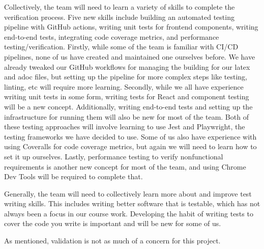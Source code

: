 \documentclass[12pt, titlepage]{article}
\begin{document}
\begin{enumerate}
    Collectively, the team will need to learn a variety of skills to complete
    the verification process. Five new skills include building an automated
    testing pipeline with GitHub actions, writing unit tests for frontend
    components, writing end-to-end tests, integrating code coverage metrics,
    and performance testing/verification. Firstly, while some of the team is
    familiar with CI/CD pipelines, none of us have created and maintained one
    ourselves before. We have already tweaked our GitHub workflows for managing
    the building for our latex and adoc files, but setting up the pipeline for
    more complex steps like testing, linting, etc will require more learning.
    Secondly, while we all have experience writing unit tests in some form,
    writing tests for React and component testing will be a new concept.
    Additionally, writing end-to-end tests and setting up the infrastructure
    for running them will also be new for most of the team. Both of these
    testing approaches will involve learning to use Jest and Playwright, the
    testing frameworks we have decided to use. Some of us also have experience
    with using Coveralls for code coverage metrics, but again we will need to
    learn how to set it up ourselves. Lastly, performance testing to verify
    nonfunctional requirements is another new concept for most of the team, and
    using Chrome Dev Tools will be required to complete that.

    Generally, the team will need to collectively learn more about and improve
    test writing skills. This includes writing better software that is
    testable, which has not always been a focus in our course work. Developing
    the habit of writing tests to cover the code you write is important and
    will be new for some of us.

    As mentioned, validation is not as much of a concern for this project.


\end{enumerate}
\end{document}
